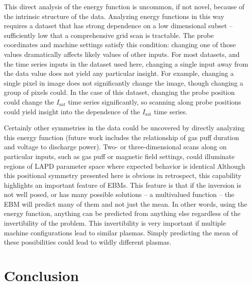 This direct analysis of the energy function is uncommon, if not novel, because of the intrinsic structure of the data. Analyzing energy functions in this way requires a dataset that has strong dependence on a low dimensional subset -- sufficiently low that a comprehensive grid scan is tractable. The probe coordinates and machine settings satisfy this condition: changing one of those values dramatically affects likely values of other inputs. For most datasets, and the time series inputs in the dataset used here, changing a single input away from the data value does not yield any particular insight. For example, changing a single pixel in image does not significantly change the image, though changing a group of pixels could. In the case of this dataset, changing the probe position could change the $I_\text{sat}$ time series significantly, so scanning along probe positions could yield insight into the dependence of the $I_\text{sat}$ time series. 

Certainly other symmetries in the data could be uncovered by directly analyzing this energy function (future work includes the relationship of gas puff duration and voltage to discharge power). Two- or three-dimensional scans along on particular inputs, such as gas puff or magnetic field settings, could illuminate regions of LAPD parameter space where expected behavior is identical Although this positional symmetry presented here is obvious in retrospect, this capability highlights an important feature of EBMs. This feature is that if the inversion is not well posed, or has many possible solutions -- a multivalued function -- the EBM will predict many of them and not just the mean. In other words, using the energy function, anything can be predicted from anything else regardless of the invertibility of the problem. This invertibility is very important if multiple machine configurations lead to similar plasmas. Simply predicting the mean of these possibilities could lead to wildly different plasmas.


\section{Conclusion}

